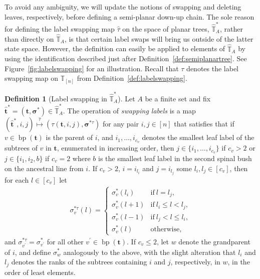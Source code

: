 \documentclass[a4paper, final]{amsart}
\theoremstyle{plain}
\theoremstyle{definition}
\newtheorem{defi}[thm]{Definition}
\newcommand{\tree}[1][t]{\boldsymbol{#1}}
\newcommand{\that}[1][t]{\hat{\boldsymbol{#1}}} %
\newcommand{\treesigma}[1][\sigma]{\boldsymbol{#1}}
\newcommand{\Thatspace}[1][\T]{\widehat{\boldsymbol{#1}}} %
\newcommand{\T}{\mathbb{T}}
\DeclareMathOperator{\branchpoints}{bp}
\begin{document}
To avoid any ambiguity, we will update the notions of swapping and deleting leaves, respectively, before defining a semi-planar down-up chain.
The sole reason for defining the label swapping map $\hat{\tau}$ on the space of planar trees, $\Thatspace_A^*$, rather than directly on $\Thatspace_A$, is that certain label swaps will bring us outside of the latter state space.
However, the definition can easily be applied to elements of $\Thatspace_A$ by using the identification described just after Definition~\ref{def:semiplanartree}.
See Figure~\ref{fig:labelswapping} for an illustration.
Recall that $\tau$ denotes the label swapping map on $\T_{[n]}$ from Definition~\ref{def:labelswapping}.
%
\begin{defi}[Label swapping in $\Thatspace_A^*$]\label{def:labelswappingplanar}
  Let $A$ be a finite set and fix $\that^* = (\tree, \treesigma^*) \in \Thatspace_A^*$.
  The operation of \textit{swapping labels} is a map $\left( \that^*, i, j \right) \stackrel{\hat{\tau}}{\mapsto} \left( \tau(\tree, i, j), \treesigma^{* \tau} \right)$ for any pair $i,j \in [n]$ that satisfies that if $v \in \branchpoints (\tree)$ is the parent of $i$, and $i_1, \ldots, i_{c_v}$ denotes the smallest leaf label of the subtrees of $v$ in $\tree$, enumerated in increasing order, then $j \in \{i_1, \ldots, i_{c_v}\}$ if $c_v > 2$ or $j \in \{i_1, i_2, b\}$ if $c_v = 2$ where $b$ is the smallest leaf label in the second spinal bush on the ancestral line from $i$. 
  If $c_v > 2$, $i = i_{l_i}$ and $j = i_{l_j}$ some $l_i, l_j \in [c_v]$, then for each $l \in [c_v]$ let
  \begin{align*}
    \sigma_v^{* \tau} (l)
    = \begin{cases}
      \sigma_v^* (l_i) & \text{if}\ l = l_j, \\
      \sigma_v^* (l+1) & \text{if}\ l_i \leq l < l_j, \\
      \sigma_v^* (l-1) & \text{if}\ l_j < l \leq l_i, \\
      \sigma_v^* (l) & \text{otherwise},
    \end{cases}
  \end{align*}
  and $\sigma_{v^\prime}^{* \tau} = \sigma_{v^\prime}^*$ for all other $v^\prime \in \branchpoints (\tree)$.
  If $c_v \leq 2$, let $w$ denote the grandparent of $i$, and define $\sigma_w^*$ analogously to the above, with the slight alteration that $l_i$ and $l_j$ denotes the ranks of the subtrees containing $i$ and $j$, respectively, in $w$, in the order of least elements.
\end{defi}
\end{document}
